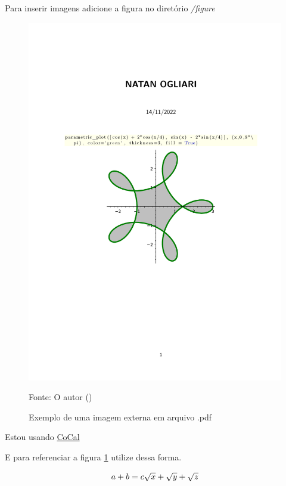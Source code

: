 Para inserir imagens adicione a figura no diretório \textit{/figure}

\begin{figure}[H]
\centering
\caption{Exemplo de uma imagem externa em arquivo .pdf}
\includegraphics[width=1\textwidth]{figure/Welcome to CoCalc.pdf}
\label{fig:imagem_massa}

\raggedright{\fontsize{10pt}{\baselineskip}\selectfont Fonte: O autor (\ano)}

\end{figure}

\par Estou usando \href {https://cocalc.com/} {CoCal}

E para referenciar a figura \ref{fig:imagem_massa} utilize dessa forma.

\begin{equation}
  a + b = c \label{1}
  $$ $$ %
  \sqrt{x} + \sqrt{\smash[b]{y}} + \sqrt{z}
\end{equation}


